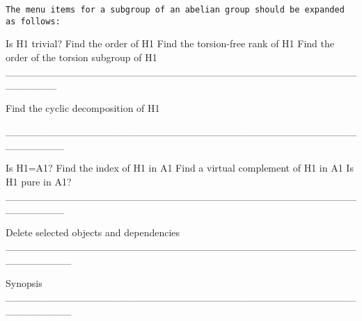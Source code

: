 {\tt The menu items for a subgroup of an abelian group should
be expanded as follows:}

Is H1 trivial?
Find the order of H1
Find the torsion-free rank of H1
Find the order of the torsion subgroup of H1
_______________________________________________________

Find the cyclic decomposition of H1

________________________________________________________

Is H1=A1?
Find the index of H1 in A1
Find a virtual complement of H1 in A1
Is H1 pure in A1?
________________________________________________________

Delete selected objects and dependencies
_________________________________________________________

Synopsis
_________________________________________________________

